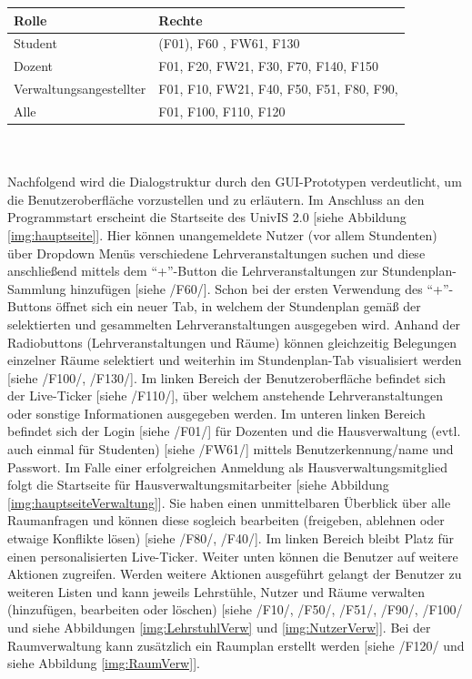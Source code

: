 \begin{table}[H]
\begin{tabular}{l|l}
Rolle&Rechte\\
\hline
\hline
Student & (F01), F60 , FW61, F130 \\
\hline
Dozent & F01, F20, FW21, F30, F70, F140, F150  \\
\hline
Verwaltungsangestellter & F01, F10, FW21, F40, F50, F51, F80, F90,  \\
\hline
Alle & F01, F100, F110, F120
\end{tabular}
\end{table}
\\
\\
Nachfolgend wird die Dialogstruktur durch den GUI-Prototypen verdeutlicht, um die Benutzeroberfläche vorzustellen und zu erläutern.
Im Anschluss an den Programmstart erscheint die Startseite des UnivIS 2.0 [siehe Abbildung \ref{img:hauptseite}]. Hier können unangemeldete Nutzer (vor allem Stundenten) über Dropdown Menüs verschiedene Lehrveranstaltungen suchen und diese anschließend mittels dem "`+"'-Button die Lehrveranstaltungen zur Stundenplan-Sammlung hinzufügen  [siehe /F60/]. Schon bei der ersten Verwendung des "`+"'-Buttons öffnet sich ein neuer Tab, in welchem der Stundenplan gemäß der selektierten und gesammelten Lehrveranstaltungen ausgegeben wird. Anhand der Radiobuttons (Lehrveranstaltungen und Räume) können gleichzeitig Belegungen einzelner Räume selektiert und weiterhin im Stundenplan-Tab visualisiert werden [siehe /F100/, /F130/].
Im linken Bereich der Benutzeroberfläche befindet sich der Live-Ticker [siehe /F110/], über welchem anstehende Lehrveranstaltungen oder sonstige Informationen ausgegeben werden.
Im unteren linken Bereich befindet sich der Login [siehe /F01/] für Dozenten und die Hausverwaltung (evtl. auch einmal für Studenten) [siehe /FW61/] mittels Benutzerkennung/name und Passwort.
Im Falle einer erfolgreichen Anmeldung als Hausverwaltungsmitglied folgt die Startseite für Hausverwaltungsmitarbeiter [siehe Abbildung \ref{img:hauptseiteVerwaltung}]. 
Sie haben einen unmittelbaren Überblick über alle Raumanfragen und können diese sogleich bearbeiten (freigeben, ablehnen oder etwaige Konflikte lösen) [siehe /F80/, /F40/].
Im linken Bereich bleibt Platz für einen personalisierten Live-Ticker. Weiter unten können die Benutzer auf weitere Aktionen zugreifen.
Werden weitere Aktionen ausgeführt gelangt der Benutzer zu weiteren Listen und kann jeweils Lehrstühle, Nutzer und Räume verwalten (hinzufügen, bearbeiten oder löschen) [siehe /F10/, /F50/, /F51/, /F90/, /F100/ und siehe Abbildungen \ref{img:LehrstuhlVerw} und \ref{img:NutzerVerw}]. Bei der Raumverwaltung kann zusätzlich ein Raumplan erstellt werden [siehe /F120/ und siehe Abbildung \ref{img:RaumVerw}].
